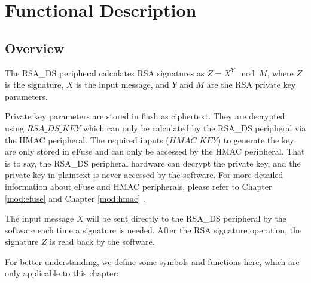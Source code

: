 \documentclass[main\_\_EN.tex]{subfiles}
\begin{document}
\section{Functional Description}
\subsection{Overview}

The RSA\_DS peripheral calculates RSA signatures as \begin{math}Z = X^{Y} \bmod M\end{math}, where \begin{math}Z\end{math} is the signature, \begin{math}X\end{math} is the input message, and \begin{math}Y\end{math} and \begin{math}M\end{math} are the RSA private key parameters.

Private key parameters are stored in flash as ciphertext. They are decrypted using \begin{math} RSA\_DS\_KEY \end{math} which can only be calculated by the RSA\_DS peripheral via the HMAC peripheral. The required inputs (\begin{math} HMAC\_KEY \end{math}) to generate the key are only stored in eFuse and can only be accessed by the HMAC peripheral. That is to say, the RSA\_DS peripheral hardware can decrypt the private key, and the private key in plaintext is never accessed by the software. For more detailed information about eFuse and HMAC peripherals, please refer to Chapter \ref{mod:efuse} \textit{} and Chapter \ref{mod:hmac} \textit{}.

The input message \begin{math}X\end{math} will be sent directly to the RSA\_DS peripheral by the software each time a signature is needed. After the RSA signature operation, the signature \begin{math}Z\end{math} is read back by the software.

For better understanding, we define some symbols and functions here, which are only applicable to this chapter:
\end{document}
